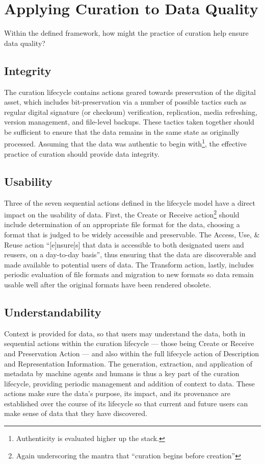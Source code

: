 \documentclass{acm_proc_article-sp}
\begin{document}
\section{Applying Curation to Data Quality}

Within the defined framework, how might the practice of curation help
ensure data quality?

\subsection{Integrity}

The curation lifecycle \cite{dcc:lifecycle} contains actions geared
towards preservation of the digital asset, which includes
bit-preservation via a number of possible tactics such as regular
digital signature (or checksum) verification, replication, media
refreshing, version management, and file-level backups. These tactics
taken together should be sufficient to ensure that the data remains in
the same state as originally processed. Assuming that the data was
authentic to begin with\footnote{Authenticity is evaluated higher up
  the stack.}, the effective practice of curation should provide data
integrity.

\subsection{Usability}

Three of the seven sequential actions defined in the lifecycle model
have a direct impact on the usability of data. First, the Create or
Receive action\footnote{Again underscoring the mantra that ``curation
  begins before creation''} should include determination of an
appropriate file format for the data, choosing a format that is judged
to be widely accessible and preservable. The Access, Use, \& Reuse
action ``[e]nsure[s] that data is accessible to both designated users
and reusers, on a day-to-day basis'', thus ensuring that the data are
discoverable and made available to potential users of data. The
Transform action, lastly, includes periodic evaluation of file formats
and migration to new formats so data remain usable well after the
original formats have been rendered obsolete.

\subsection{Understandability}

Context is provided for data, so that users may understand the data,
both in sequential actions within the curation lifecycle --- those
being Create or Receive and Preservation Action --- and also within
the full lifecycle action of Description and Representation
Information. The generation, extraction, and application of metadata
by machine agents and humans is thus a key part of the curation
lifecycle, providing periodic management and addition of context to
data.  These actions make sure the data's purpose, its impact, and its
provenance are established over the course of its lifecycle so that
current and future users can make sense of data that they have
discovered.
\end{document}
